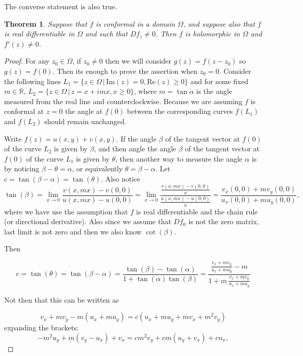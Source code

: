 \documentclass{amsart}
\newtheorem{thm}{Theorem}
\begin{document}
The converse statement is also true.

\begin{thm}
Suppose that \(f\) is conformal in a domain \(\Omega\), and suppose also that \(f\) is real differentiable in \(\Omega\) and such that \(Df_z \neq 0\). Then \(f\) is holomorphic in \(\Omega\) and \(f'(z) \neq 0\).
\end{thm}

\begin{proof}
For any \(z_0\in\Omega\), if \(z_0 \neq 0\) then we will consider \(g(z) = f(z - z_0)\) so \(g(z) = f(0)\). Then its enough to prove the assertion when \(z_0 = 0\).
Consider the following lines \(L_1 = \{z \in \Omega \, | \, \mbox{Im}(z) = 0, \mbox{Re}(z) \geq 0 \}\) and for some fixed \(m\in \mathbb{R}\), \(L_2 = \{ z\in \Omega \, | \, z = x + i mx, x\geq 0 \}\), where \(m=\tan \alpha\) is the angle measured from the real line and counterclockwise.
Because we are assuming \(f\) is conformal at \(z=0\) the angle at \(f(0)\) between the corresponding curves \(f(L_1)\) and \(f(L_2)\) should remain unchanged. 

Write \(f(z) = u(x,y) + v(x,y)\). If the angle \(\beta\) of the tangent vector at \(f(0)\) of the curve \(L_2\) is given by \(\beta\), and then angle the angle \(\beta\) of the tangent vector at \(f(0)\) of the curve \(L_1\) is given by \(\theta\), then another way to measure the angle \(\alpha\) is by noticing \(\beta - \theta = \alpha\), or equivalently \(\theta = \beta - \alpha\). Let \(c = \tan (\beta - \alpha) = \tan (\theta)\). Also notice
\[ \tan(\beta)=\lim_{x\to 0} \frac{v(x,mx) - v(0,0)}{u(x,mx)- u(0,0)} = \lim_{x\to 0} \frac{\frac{v(x,mx) - v(0,0)}{x}}{\frac{u(x,mx) - u(0,0)}{x}}= \frac{v_x(0,0) + m v_y(0,0)}{u_x(0,0)+ m u_y(0,0)}, \]
where we have use the assumption that \(f\) is real differentiable and the chain rule (or directional derivative). Also since we assume that \(Df_0\) is not the zero matrix, last limit is not zero and then we also know \(\cot(\beta)\).

Then

\[ c = \tan(\theta) = \tan(\beta - \alpha) = \frac{\tan(\beta) - \tan(\alpha)}{1 + \tan(\alpha)\tan(\beta)} = \frac{ \frac{v_x + m v_y}{u_x + m u_y} - m}{ 1 + m\, \frac{v_x + m v_y}{u_x + m u_y}} \]

Not then that this can be written as

\[ v_x + mv_y - m(u_x + m u_y)  = c( u_x + m u_y + m v_x + m^2 v_y) \]
expanding the brackets:
\[ - m^2 u_y + m(v_y - u_x) + v_x = cm^2 v_y + cm( u_y + v_x)  + cu_x, \]


\end{proof}
\end{document}

